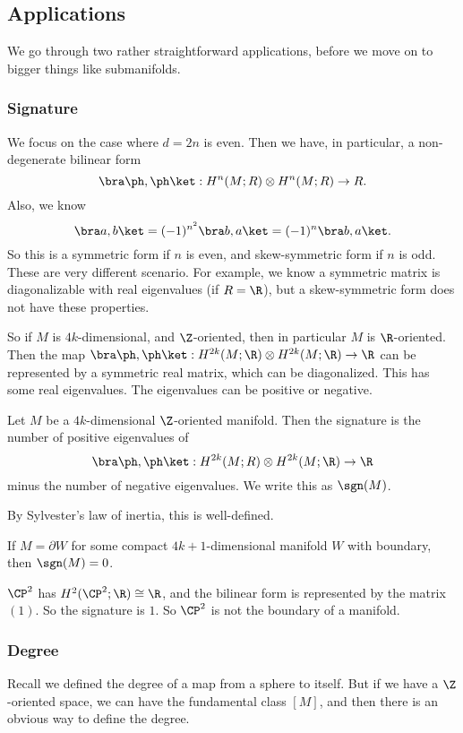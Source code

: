 \documentclass[a4paper]{article}
\begin{document}
\subsection{Applications}
We go through two rather straightforward applications, before we move on to bigger things like submanifolds.

\subsubsection*{Signature}
We focus on the case where $d = 2n$ is even. Then we have, in particular, a non-degenerate bilinear form
\[
  \bra \ph, \ph\ket : H^n(M; R) \otimes H^n(M; R) \to R.
\]
Also, we know
\[
  \bra a, b\ket = (-1)^{n^2}\bra b, a\ket = (-1)^n \bra b, a \ket.
\]
So this is a symmetric form if $n$ is even, and skew-symmetric form if $n$ is odd. These are very different scenario. For example, we know a symmetric matrix is diagonalizable with real eigenvalues (if $R = \R$), but a skew-symmetric form does not have these properties.

So if $M$ is $4k$-dimensional, and $\Z$-oriented, then in particular $M$ is $\R$-oriented. Then the map $\bra \ph, \ph\ket : H^{2k}(M; \R) \otimes H^{2k}(M; \R) \to \R$ can be represented by a symmetric real matrix, which can be diagonalized. This has some real eigenvalues. The eigenvalues can be positive or negative.
\begin{defi}
  Let $M$ be a $4k$-dimensional $\Z$-oriented manifold. Then the signature is the number of positive eigenvalues of
  \[
    \bra \ph, \ph\ket: H^{2k}(M; R) \otimes H^{2k}(M; \R) \to \R
  \]
  minus the number of negative eigenvalues. We write this as $\sgn(M)$.
\end{defi}
By Sylvester's law of inertia, this is well-defined.

\begin{fact}
  If $M = \partial W$ for some compact $4k + 1$-dimensional manifold $W$ with boundary, then $\sgn(M) = 0$.
\end{fact}

\begin{eg}
  $\CP^2$ has $H^2(\CP^2; \R) \cong \R$, and the bilinear form is represented by the matrix $(1)$. So the signature is $1$. So $\CP^2$ is not the boundary of a manifold.
\end{eg}

\subsubsection*{Degree}
Recall we defined the degree of a map from a sphere to itself. But if we have a $\Z$-oriented space, we can have the fundamental class $[M]$, and then there is an obvious way to define the degree.
\end{document}
